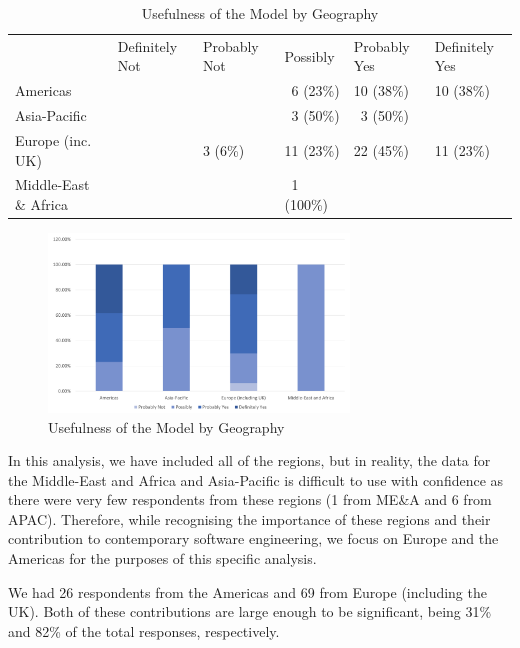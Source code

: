 \begin{table}
\caption{Usefulness of the Model by Geography}
\label{table:usefulnessbygeo}
\footnotesize
\begin{tabular}{l p{1.5cm} p{1.5cm} p{1.5cm} p{1.5cm} p{1.5cm}}
 & \centering Definitely Not & 
   \centering Probably Not & 
   \centering Possibly & 
   \centering Probably Yes & 
   \centering Definitely Yes \tabularnewline
Americas              & &         & ~6 (23\%)  & 10 (38\%) & 10 (38\%) \\
Asia-Pacific          & &         & ~3 (50\%)  & ~3 (50\%) & \\
Europe (inc. UK)      & & 3 (6\%) & 11 (23\%)  & 22 (45\%) & 11 (23\%) \\
Middle-East \& Africa & &         & ~1 (100\%) &           & \\
\end{tabular}
\end{table}
 
\begin{figure}
\centering
\includegraphics[width=8cm,trim={2 2 2 2},clip]{Figures/prioritisation-usefulness-by-geo}
\caption{Usefulness of the Model by Geography}
\label{figure:usefulnessbygeo}
\end{figure}

In this analysis, we have included all of the regions, but in reality, the data for the Middle-East and Africa and Asia-Pacific is difficult to use with confidence as there were very few respondents from these regions (1 from ME\&A and 6 from APAC).  Therefore, while recognising the importance of these regions and their contribution to contemporary software engineering, we focus on Europe and the Americas for the purposes of this specific analysis.

We had 26 respondents from the Americas and 69 from Europe (including the UK).  Both of these contributions are large enough to be significant, being 31\% and 82\% of the total responses, respectively.

